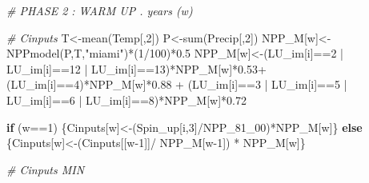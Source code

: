 \documentclass[
  10pt,
  b5paper,
]{book}
\newenvironment{Shaded}{\begin{snugshade}}{\end{snugshade}}
\newcommand{\CommentTok}[1]{\textcolor[rgb]{0.56,0.35,0.01}{\textit{#1}}}
\newcommand{\ControlFlowTok}[1]{\textcolor[rgb]{0.13,0.29,0.53}{\textbf{#1}}}
\newcommand{\DecValTok}[1]{\textcolor[rgb]{0.00,0.00,0.81}{#1}}
\newcommand{\FloatTok}[1]{\textcolor[rgb]{0.00,0.00,0.81}{#1}}
\newcommand{\FunctionTok}[1]{\textcolor[rgb]{0.00,0.00,0.00}{#1}}
\newcommand{\NormalTok}[1]{#1}
\newcommand{\OtherTok}[1]{\textcolor[rgb]{0.56,0.35,0.01}{#1}}
\newcommand{\SpecialCharTok}[1]{\textcolor[rgb]{0.00,0.00,0.00}{#1}}
\newcommand{\StringTok}[1]{\textcolor[rgb]{0.31,0.60,0.02}{#1}}
\begin{document}
\begin{Shaded}
\begin{Highlighting}[]
\CommentTok{\# PHASE 2  : WARM UP .  years (w)}

\CommentTok{\# Cinputs }
\NormalTok{T}\OtherTok{\textless{}{-}}\FunctionTok{mean}\NormalTok{(Temp[,}\DecValTok{2}\NormalTok{])}
\NormalTok{P}\OtherTok{\textless{}{-}}\FunctionTok{sum}\NormalTok{(Precip[,}\DecValTok{2}\NormalTok{])}
\NormalTok{NPP\_M[w]}\OtherTok{\textless{}{-}}\FunctionTok{NPPmodel}\NormalTok{(P,T,}\StringTok{"miami"}\NormalTok{)}\SpecialCharTok{*}\NormalTok{(}\DecValTok{1}\SpecialCharTok{/}\DecValTok{100}\NormalTok{)}\SpecialCharTok{*}\FloatTok{0.5}
\NormalTok{NPP\_M[w]}\OtherTok{\textless{}{-}}\NormalTok{(LU\_im[i]}\SpecialCharTok{==}\DecValTok{2} \SpecialCharTok{|}\NormalTok{ LU\_im[i]}\SpecialCharTok{==}\DecValTok{12} \SpecialCharTok{|}\NormalTok{ LU\_im[i]}\SpecialCharTok{==}\DecValTok{13}\NormalTok{)}\SpecialCharTok{*}\NormalTok{NPP\_M[w]}\SpecialCharTok{*}\FloatTok{0.53}\SpecialCharTok{+}\NormalTok{ (LU\_im[i]}\SpecialCharTok{==}\DecValTok{4}\NormalTok{)}\SpecialCharTok{*}\NormalTok{NPP\_M[w]}\SpecialCharTok{*}\FloatTok{0.88} \SpecialCharTok{+}\NormalTok{ (LU\_im[i]}\SpecialCharTok{==}\DecValTok{3} \SpecialCharTok{|}\NormalTok{ LU\_im[i]}\SpecialCharTok{==}\DecValTok{5} \SpecialCharTok{|}\NormalTok{ LU\_im[i]}\SpecialCharTok{==}\DecValTok{6} \SpecialCharTok{|}\NormalTok{ LU\_im[i]}\SpecialCharTok{==}\DecValTok{8}\NormalTok{)}\SpecialCharTok{*}\NormalTok{NPP\_M[w]}\SpecialCharTok{*}\FloatTok{0.72}

\ControlFlowTok{if}\NormalTok{ (w}\SpecialCharTok{==}\DecValTok{1}\NormalTok{) \{Cinputs[w]}\OtherTok{\textless{}{-}}\NormalTok{(Spin\_up[i,}\DecValTok{3}\NormalTok{]}\SpecialCharTok{/}\NormalTok{NPP\_81\_00)}\SpecialCharTok{*}\NormalTok{NPP\_M[w]\} }\ControlFlowTok{else}\NormalTok{ \{Cinputs[w]}\OtherTok{\textless{}{-}}\NormalTok{(Cinputs[[w}\DecValTok{{-}1}\NormalTok{]]}\SpecialCharTok{/}\NormalTok{ NPP\_M[w}\DecValTok{{-}1}\NormalTok{]) }\SpecialCharTok{*}\NormalTok{ NPP\_M[w]\} }

\CommentTok{\# Cinputs MIN}


\end{Highlighting}
\end{Shaded}
\end{document}
